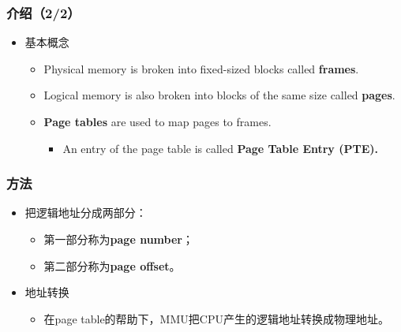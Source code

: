 \documentclass[CJKutf8,xcolor=pdftex,dvipsnames,table]{beamer}
\begin{document}
\begin{CJK*}{UTF8}{song}
  \begin{frame}
  \frametitle{介绍（2/2）} \pause
  \begin{itemize}
  \item{基本概念} \pause
    \begin{itemize}
    \item{Physical memory is broken into fixed-sized blocks called \textbf{frames}.} \pause
    \item{Logical memory is also broken into blocks of the same size called \textbf{pages}.} \pause
    \item{\textbf{Page tables} are used to map pages to frames.} \pause
      \begin{itemize}
      \item{An entry of the page table is called \textbf{Page Table Entry (PTE).}}
      \end{itemize}
    \end{itemize}
  \end{itemize}
  \end{frame}
  
  \begin{frame}
  \frametitle{方法} \pause
  \begin{itemize}
  \item{把逻辑地址分成两部分：} \pause
    \begin{itemize}
    \item{第一部分称为\textbf{page number}；} \pause
    \item{第二部分称为\textbf{page offset}。} \pause
    \end{itemize}
  \item{地址转换} \pause
    \begin{itemize}
    \item{在page table的帮助下，MMU把CPU产生的逻辑地址转换成物理地址。}
    \end{itemize}
  \end{itemize}
  \end{frame}
  

\end{CJK*}
\end{document}
